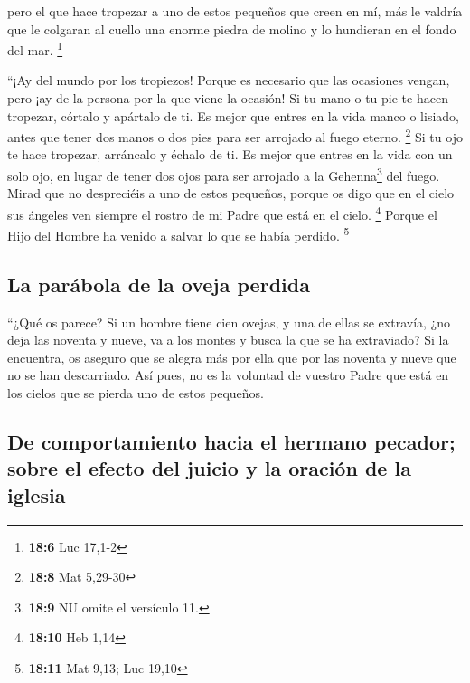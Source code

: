  pero el que hace tropezar a uno de estos pequeños que
creen en mí, más le valdría que le colgaran al cuello una enorme piedra
de molino y lo hundieran en el fondo del mar. \footnote{\textbf{18:6}
  Luc 17,1-2}

 ``¡Ay del mundo por los tropiezos! Porque es necesario
que las ocasiones vengan, pero ¡ay de la persona por la que viene la
ocasión!  Si tu mano o tu pie te hacen tropezar, córtalo y
apártalo de ti. Es mejor que entres en la vida manco o lisiado, antes
que tener dos manos o dos pies para ser arrojado al fuego eterno.
\footnote{\textbf{18:8} Mat 5,29-30}  Si tu ojo te hace
tropezar, arráncalo y échalo de ti. Es mejor que entres en la vida con
un solo ojo, en lugar de tener dos ojos para ser arrojado a la
Gehenna\footnote{\textbf{18:9} NU omite el versículo 11.} del fuego.
 Mirad que no despreciéis a uno de estos pequeños, porque
os digo que en el cielo sus ángeles ven siempre el rostro de mi Padre
que está en el cielo. \footnote{\textbf{18:10} Heb 1,14} 
Porque el Hijo del Hombre ha venido a salvar lo que se había perdido.
\footnote{\textbf{18:11} Mat 9,13; Luc 19,10}

\hypertarget{la-paruxe1bola-de-la-oveja-perdida}{%
\subsection{La parábola de la oveja
perdida}\label{la-paruxe1bola-de-la-oveja-perdida}}

 ``¿Qué os parece? Si un hombre tiene cien ovejas, y una
de ellas se extravía, ¿no deja las noventa y nueve, va a los montes y
busca la que se ha extraviado?  Si la encuentra, os
aseguro que se alegra más por ella que por las noventa y nueve que no se
han descarriado.  Así pues, no es la voluntad de vuestro
Padre que está en los cielos que se pierda uno de estos pequeños.

\hypertarget{de-comportamiento-hacia-el-hermano-pecador-sobre-el-efecto-del-juicio-y-la-oraciuxf3n-de-la-iglesia}{%
\subsection{De comportamiento hacia el hermano pecador; sobre el efecto
del juicio y la oración de la
iglesia}\label{de-comportamiento-hacia-el-hermano-pecador-sobre-el-efecto-del-juicio-y-la-oraciuxf3n-de-la-iglesia}}

